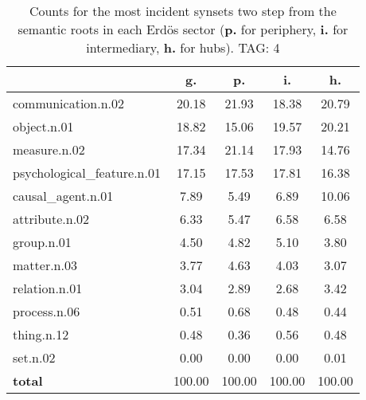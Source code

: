 \begin{table}[h!]
\begin{center}
\begin{tabular}{| l || c | c | c | c |}\hline
 & {\bf g.} & {\bf p.} & {\bf i.} & {\bf h.} \\\hline\hline
communication.n.02 & 20.18  & 21.93  & 18.38  & 20.79 \\\hline
object.n.01 & 18.82  & 15.06  & 19.57  & 20.21 \\\hline
measure.n.02 & 17.34  & 21.14  & 17.93  & 14.76 \\\hline
psychological\_feature.n.01 & 17.15  & 17.53  & 17.81  & 16.38 \\\hline
causal\_agent.n.01 & 7.89  & 5.49  & 6.89  & 10.06 \\\hline
attribute.n.02 & 6.33  & 5.47  & 6.58  & 6.58 \\\hline
group.n.01 & 4.50  & 4.82  & 5.10  & 3.80 \\\hline
matter.n.03 & 3.77  & 4.63  & 4.03  & 3.07 \\\hline
relation.n.01 & 3.04  & 2.89  & 2.68  & 3.42 \\\hline
process.n.06 & 0.51  & 0.68  & 0.48  & 0.44 \\\hline
thing.n.12 & 0.48  & 0.36  & 0.56  & 0.48 \\\hline
set.n.02 & 0.00  & 0.00  & 0.00  & 0.01 \\\hline\hline
{{\bf total}} & 100.00  & 100.00  & 100.00  & 100.00 \\\hline
\end{tabular}
\caption{Counts for the most incident synsets two step from the semantic roots in each Erd\"os sector ({\bf p.} for periphery, {\bf i.} for intermediary, {\bf h.} for hubs). TAG: 4}
\end{center}
\end{table}